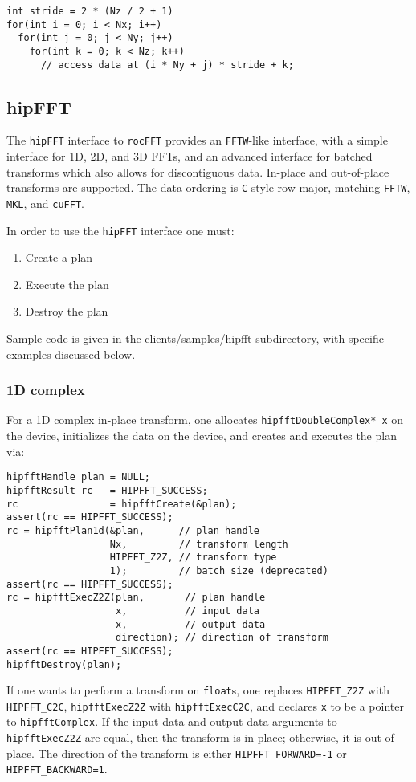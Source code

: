 \documentclass[10pt]{article}
\renewcommand{\(}{\left(}
\renewcommand{\)}{\right)}
\begin{document}
\begin{lstlisting}
int stride = 2 * (Nz / 2 + 1)
for(int i = 0; i < Nx; i++)
  for(int j = 0; j < Ny; j++)
    for(int k = 0; k < Nz; k++)
      // access data at (i * Ny + j) * stride + k;
\end{lstlisting}

\subsection{hipFFT}


The \texttt{hipFFT} interface to \texttt{rocFFT} provides an
\texttt{FFTW}-like interface, with a simple interface for 1D, 2D, and
3D FFTs, and an advanced interface for batched transforms which also
allows for discontiguous data.  In-place and out-of-place transforms
are supported.  The data ordering is \texttt{C}-style row-major, matching
\texttt{FFTW}, \texttt{MKL}, and \texttt{cuFFT}.

In order to use the \texttt{hipFFT} interface one must:
\begin{enumerate}
\item Create a plan
\item Execute the plan
\item Destroy the plan
\end{enumerate}
Sample code is given in the \url{clients/samples/hipfft} subdirectory,
with specific examples discussed below.

\subsubsection{1D complex}
For a 1D complex in-place transform, one allocates
\lstinline{hipfftDoubleComplex* x} on the device, initializes the data
on the device, and creates and executes the plan via:
\begin{lstlisting}
hipfftHandle plan = NULL;
hipfftResult rc   = HIPFFT_SUCCESS;
rc                = hipfftCreate(&plan);
assert(rc == HIPFFT_SUCCESS);
rc = hipfftPlan1d(&plan,      // plan handle
                  Nx,         // transform length
                  HIPFFT_Z2Z, // transform type 
                  1);         // batch size (deprecated)
assert(rc == HIPFFT_SUCCESS);
rc = hipfftExecZ2Z(plan,       // plan handle
                   x,          // input data
                   x,          // output data
                   direction); // direction of transform
assert(rc == HIPFFT_SUCCESS);
hipfftDestroy(plan);
\end{lstlisting}
If one wants to perform a transform on \lstinline{float}s, one
replaces \lstinline{HIPFFT_Z2Z} with \lstinline{HIPFFT_C2C},
\lstinline{hipfftExecZ2Z} with \lstinline{hipfftExecC2C}, and declares
\lstinline{x} to be a pointer to \lstinline{hipfftComplex}.  If the
input data and output data arguments to \lstinline{hipfftExecZ2Z} are
equal, then the transform is in-place; otherwise, it is out-of-place.
The direction of the transform is either \lstinline{HIPFFT_FORWARD=-1}
or \lstinline{HIPFFT_BACKWARD=1}.
\end{document}
